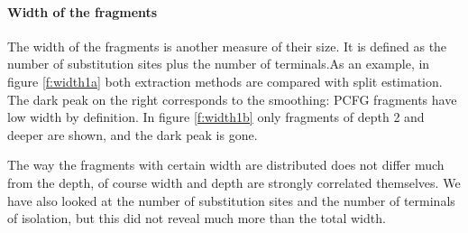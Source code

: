 \paragraph{Width of the fragments}
The width of the fragments is another measure of their size. It is defined as the number of substitution sites plus the number of terminals.As an example, in figure \ref{f:width1a} both extraction methods are compared with split estimation.  The dark peak on the right corresponds to the smoothing: PCFG fragments have low width by definition. In figure \ref{f:width1b} only fragments of depth 2 and deeper are shown, and the dark peak is gone.

The way the fragments with certain width are distributed does not differ much from the depth, of course width and depth are strongly correlated themselves. We have also looked at the number of substitution sites and the number of terminals of isolation, but this did not reveal much more than the total width. 

